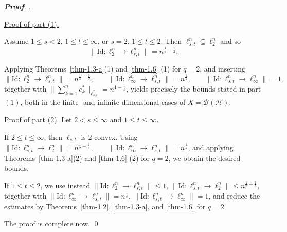 \documentclass[a4paper,11pt, reqno]{amsart}
\theoremstyle{definition}
\newenvironment{pf}[1][]{%
	\vskip 3mm
	\noindent
	\ifthenelse{\equal{#1}{}}%
	{{\slshape {\bf Proof}. }}%
	{{\slshape #1.} }%
}%
{\qed\bigskip}
\begin{document}
\begin{pf}
	\medskip
	\noindent
	\underline{Proof of part (1).}
	
	Assume $1\le s<2$, $1\le t\le\infty$, or $s=2$, $1\le t\le2$.
	Then $\ell_{s,t}^n\subseteq \ell_2^n$ and so
	\[
	\|\mathrm{Id}: \ell_2^n \to \ell_{s,t}^n\|
	= n^{\frac1s-\frac12}.
	\]
	
	Applying Theorems~\ref{thm-1.3-a}(1) and
	\ref{thm-1.6} (1) for $q=2$, and inserting
	\[
	\|\mathrm{Id}: \ell_2^n \to \ell_{s,t}^n\|
	= n^{\frac1s-\frac12},
	\qquad
	\|\mathrm{Id}: \ell_\infty^n \to \ell_{s,t}^n\|
	= n^{\frac1s},
	\qquad
	\|\mathrm{Id}: \ell_{s,t}^n \to \ell_\infty^n\|=1,
	\]
	together with
	$\Big\|\sum_{k=1}^n e_k^*\Big\|_{\ell_{s,t}^*}
	= n^{1-\frac1s}$, 
	yields precisely the bounds stated in part $(1)$, both in the
	finite- and infinite-dimensional cases of
	$X=\mathcal{B}(\mathcal{H})$.
		
	\medskip
	\noindent
	\underline{Proof of part (2).} \noindent Let $2<s\le\infty$ and $1\le t\le\infty$.
	
	If $2\le t\le\infty$, then $\ell_{s,t}$ is $2$-convex.
	Using
	$\|\mathrm{Id}: \ell_{s,t}^n \to \ell_2^n\|
	= n^{\frac12-\frac1s},
	\qquad
	\|\mathrm{Id}: \ell_\infty^n \to \ell_{s,t}^n\|
	= n^{\frac1s}$,
	and applying Theorems~\ref{thm-1.3-a}(2) and \ref{thm-1.6} (2) for $q=2$,
	we obtain the desired bounds.
	
	If $1\le t\le2$, we use instead
	$\|\mathrm{Id}: \ell_2^n \to \ell_{s,t}^n\| \le 1$, $
	\|\mathrm{Id}: \ell_{s,t}^n \to \ell_2^n\|
	\le n^{\frac12-\frac1s}$,
	together with $\|\mathrm{Id}: \ell_\infty^n \to \ell_{s,t}^n\|
	= n^{\frac1s}$, $\|\mathrm{Id}: \ell_{s,t}^n \to \ell_\infty^n\|=1$,
	and reduce the estimates by
	Theorems~\ref{thm-1.2}, \ref{thm-1.3-a}, and \ref{thm-1.6} for $q=2$.
	
	
	\medskip
	\noindent
	The proof is complete now.
\end{pf}
\end{document}
